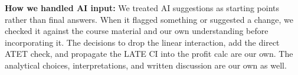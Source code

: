 \textbf{How we handled AI input:} We treated AI suggestions as starting
points rather than final answers. When it flagged something or suggested
a change, we checked it against the course material and our own
understanding before incorporating it. The decisions to drop the linear
interaction, add the direct ATET check, and propagate the LATE CI into
the profit calc are our own. The analytical choices, interpretations,
and written discussion are our own as well.

